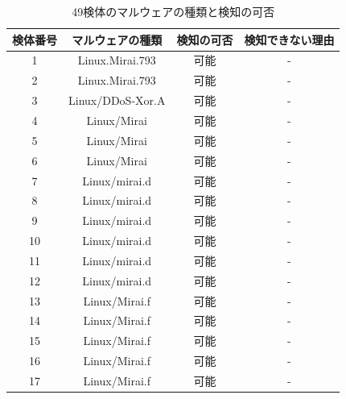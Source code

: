 \begin{small}
\begin{flushleft}
\begin{longtable}{|c|c|c|c|}
    \caption{49検体のマルウェアの種類と検知の可否}
    \label{tab:malware} \\
    
    \hline
    検体番号   & マルウェアの種類             & 検知の可否 & 検知できない理由                      \\ \hline
    \endhead
        1  & Linux.Mirai.793      & 可能    & -                             \\ \hline
        2  & Linux.Mirai.793      & 可能    & -                             \\ \hline
        3  & Linux/DDoS-Xor.A     & 可能    & -                             \\ \hline
        4  & Linux/Mirai          & 可能    & -                             \\ \hline
        5  & Linux/Mirai          & 可能    & -                             \\ \hline
        6  & Linux/Mirai          & 可能    & -                             \\ \hline
        7  & Linux/mirai.d        & 可能    & -                             \\ \hline
        8  & Linux/mirai.d        & 可能    & -                             \\ \hline
        9  & Linux/mirai.d        & 可能    & -                             \\ \hline
        10 & Linux/mirai.d        & 可能    & -                             \\ \hline
        11 & Linux/mirai.d        & 可能    & -                             \\ \hline
        12 & Linux/mirai.d        & 可能    & -                             \\ \hline
        13 & Linux/Mirai.f        & 可能    & -                             \\ \hline
        14 & Linux/Mirai.f        & 可能    & -                             \\ \hline
        15 & Linux/Mirai.f        & 可能    & -                             \\ \hline
        16 & Linux/Mirai.f        & 可能    & -                             \\ \hline
        17 & Linux/Mirai.f        & 可能    & -                             \\ \hline

\end{longtable}
\end{flushleft}
\end{small}

